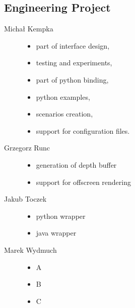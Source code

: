 	\subsection{Engineering Project}
	\begin{description}
		\item[Michał Kempka] \hfill
			\begin{itemize}
				\item part of interface design,
				\item testing and experiments,
				\item part of python binding,
				\item python examples,
				\item scenarios creation,
				\item support for configuration files.
			\end{itemize}
		\item[Grzegorz Runc] \hfill
			\begin{itemize}
				\item generation of depth buffer
				\item support for offscreen rendering
			\end{itemize}
		\item[Jakub Toczek] \hfill
			\begin{itemize}
				\item python wrapper
				\item java wrapper
			\end{itemize}
		\item[Marek Wydmuch] \hfill
			\begin{itemize}
				\item A
				\item B
				\item C
			\end{itemize}
	\end{description}
	
   	
